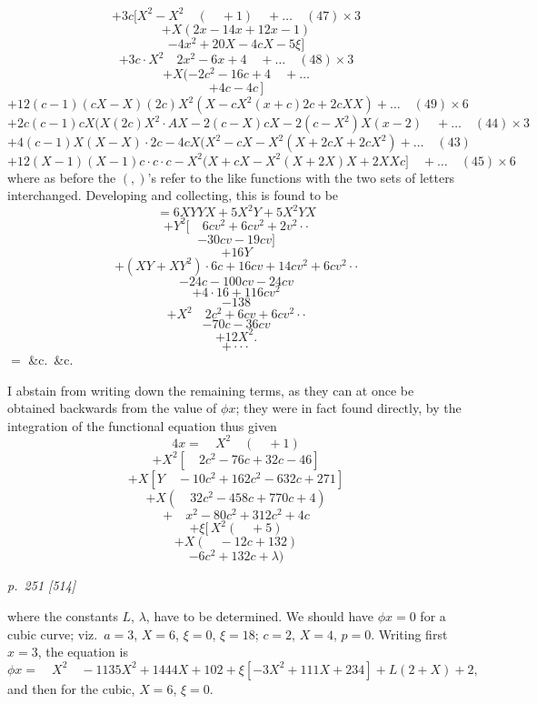 \documentclass[11pt,a4paper]{article}
\theoremstyle{plain}
\theoremstyle{definition}
\begin{document}
\noindent
\[
+ 3c[X^2 - X^2 \quad ( \quad +1) \quad + \ldots \quad (47) \times 3
\]
\[
+ X(2x - 14x + 12x - 1)
\]
\[
- 4x^2 + 20X - 4cX - 5\xi]
\]
\[
+ 3c \cdot X^2 \quad 2x^2 - 6x + 4 \quad + \ldots \quad (48) \times 3
\]
\[
+ X(-2c^2 - 16c + 4 \quad + \ldots
\]
\[
+ 4c - 4c\,]
\]
\[
+ 12(c - 1)(cX - X)(2c)X^2(X - cX^2(x + c)2c + 2cXX) + \ldots \quad (49) \times 6
\]
\[
+ 2c(c - 1)cX(X(2c)X^2 \cdot AX - 2(c - X)cX - 2(c - X^2)X(x - 2) \quad + \ldots \quad (44) \times 3
\]
\[
+ 4(c - 1)X(X - X) \cdot 2c - 4cX(X^2 - cX - X^2(X + 2cX + 2cX^2) + \ldots \quad (43)
\]
\[
+ 12(X - 1)(X - 1)c \cdot c \cdot c - X^2(X + cX - X^2(X + 2X)X + 2XXc] \quad + \ldots \quad (45) \times 6
\]
where as before the $(,)$'s refer to the like functions with the two sets of letters
interchanged.  Developing and collecting, this is found to be
\[
= 6XYY X + 5X^2 Y + 5X^2 Y X
\]
\[
+ Y^2 [ \quad 6cv^2 + 6cv^2 + 2v^2 \cdot \cdot
\]
\[
- 30cv - 19cv]
\]
\[
+ 16Y
\]
\[
+ (XY + XY^2) \cdot 6c + 16cv + 14cv^2 + 6cv^2 \cdot \cdot
\]
\[
- 24c - 100cv - 24cv
\]
\[
+ 4 \cdot 16 + 116cv^2
\]
\[
- 138
\]
\[
+ X^2 \quad 2c^2 + 6cv + 6cv^2 \cdot \cdot
\]
\[
- 70c - 36cv
\]
\[
+ 12X^2.
\]
\[
+ \cdot \cdot \cdot
\]
$ = $ \&c.\ \&c.

I abstain from writing down the remaining terms, as they can at once be obtained
backwards from the value of $\phi x$; they were in fact found directly, by the integration
of the functional equation thus given
\[
4x = \quad X^2 \quad ( \quad + 1)
\]
\[
+ X^2 [ \quad 2c^2 - 76c + 32c - 46]
\]
\[
+ X[Y \quad -10c^2 + 162c^2 - 632c + 271]
\]
\[
+ X (\quad 32c^2 - 458c + 770c + 4)
\]
\[
+ \quad x^2 - 80c^2 + 312c^2 + 4c
\]
\[
+ \xi [\, X^2 (\quad + 5)
\]
\[
+ X(\quad - 12c + 132)
\]
\[
- 6c^2 + 132c + \lambda)
\]

\clearpage

\bigskip
\textit{p.~251 [514]}
\smallskip

\noindent
where the constants $L$, $\lambda$, have to be determined.  We should have $\phi x = 0$ for a
cubic curve; viz.\ $a = 3$, $X = 6$, $\xi = 0$, $\xi = 18$; $c = 2$, $X = 4$, $p = 0$.  Writing first
$x = 3$, the equation is
\[
\phi x = \quad X^2 \quad - 1135X^2 + 1444X + 102 + \xi[-3X^2 + 111X + 234] + L(2 + X) + 2,
\]
and then for the cubic, $X = 6$, $\xi = 0$.
\end{document}
